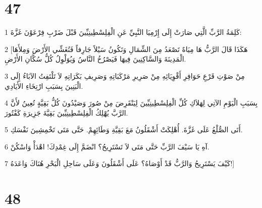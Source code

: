 \chapter{47}

\par 1 كَلِمَةُ الرَّبِّ الَّتِي صَارَتْ إِلَى إِرْمِيَا النَّبِيِّ عَنِ الْفِلِسْطِينِيِّينَ قَبْلَ ضَرْبِ فِرْعَوْنَ غَزَّةَ:
\par 2 [هَكَذَا قَالَ الرَّبُّ هَا مِيَاهٌ تَصْعَدُ مِنَ الشِّمَالِ وَتَكُونُ سَيْلاً جَارِفاً فَتُغَشِّي الأَرْضَ وَمِلأَهَا الْمَدِينَةَ وَالسَّاكِنِينَ فِيهَا فَيَصْرُخُ النَّاسُ وَيُوَلْوِلُ كُلُّ سُكَّانِ الأَرْضِ.
\par 3 مِنْ صَوْتِ قَرْعِ حَوَافِرِ أَقْوِيَائِهِ مِنْ صَرِيرِ مَرْكَبَاتِهِ وَصَرِيفِ بَكَرَاتِهِ لاَ تَلْتَفِتُ الآبَاءُ إِلَى الْبَنِينَ بِسَبَبِ ارْتِخَاءِ الأَيَادِي.
\par 4 بِسَبَبِ الْيَوْمِ الآتِي لِهَلاَكِ كُلِّ الْفِلِسْطِينِيِّينَ لِيَنْقَرِضَ مِنْ صُورَ وَصَيْدُونَ كُلُّ بَقِيَّةٍ تُعِينُ لأَنَّ الرَّبَّ يُهْلِكُ الْفِلِسْطِينِيِّينَ بَقِيَّةَ جَزِيرَةِ كَفْتُورَ.
\par 5 أَتَى الصُّلْعُ عَلَى غَزَّةَ. أُهْلِكَتْ أَشْقَلُونُ مَعَ بَقِيَّةِ وَطَائِهِمْ. حَتَّى مَتَى تَخْمِشِينَ نَفْسَكِ.
\par 6 آهِ يَا سَيْفَ الرَّبِّ حَتَّى مَتَى لاَ تَسْتَرِيحُ؟ انْضَمَّ إِلَى غِمْدِكَ! اهْدَأْ وَاسْكُنْ.
\par 7 كَيْفَ يَسْتَرِيحُ وَالرَّبُّ قَدْ أَوْصَاهُ؟ عَلَى أَشْقَلُونَ وَعَلَى سَاحِلِ الْبَحْرِ هُنَاكَ وَاعَدَهُ!]

\chapter{48}

